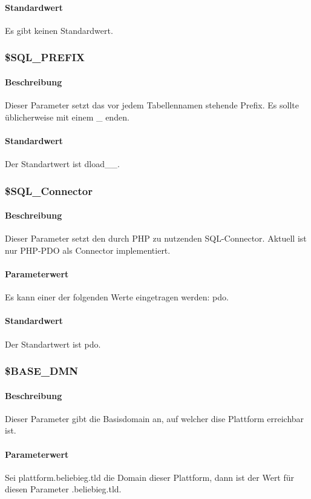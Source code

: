 \paragraph{Standardwert}Es gibt keinen Standardwert.

\subsubsection{\$SQL\_PREFIX}
\paragraph{Beschreibung}Dieser Parameter setzt das vor jedem Tabellennamen stehende Prefix. Es sollte üblicherweise mit einem {\glqq \_\grqq} enden.
\paragraph{Standardwert}Der Standartwert ist {\glqq dload\_\_\grqq}.

\subsubsection{\$SQL\_Connector}
\paragraph{Beschreibung}Dieser Parameter setzt den durch PHP zu nutzenden SQL-Connector. Aktuell ist nur PHP-PDO als Connector implementiert. 
\paragraph{Parameterwert}Es kann einer der folgenden Werte eingetragen werden: {\glqq pdo\grqq}.
\paragraph{Standardwert}Der Standartwert ist {\glqq pdo\grqq}.

\subsubsection{\$BASE\_DMN}
\paragraph{Beschreibung}Dieser Parameter gibt die Basisdomain an, auf welcher dise Plattform erreichbar ist.
\paragraph{Parameterwert}Sei {\glqq plattform.beliebieg.tld\grqq} die Domain dieser Plattform, dann ist der Wert für diesen Parameter {\glqq .beliebieg.tld\grqq}.
